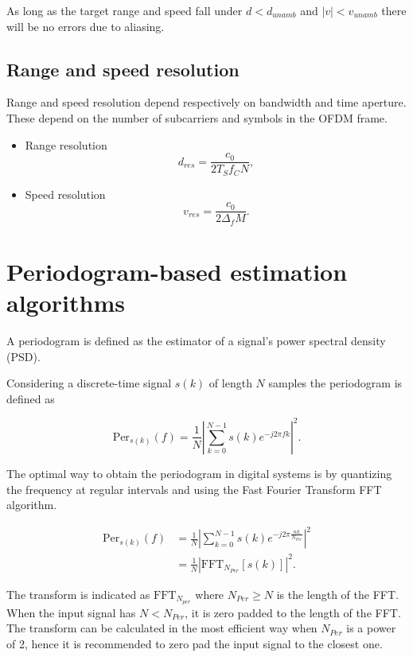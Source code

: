         As long as the target range and speed fall under $d < d_{unamb}$ and $|v| < v_{unamb}$ there will be no errors due to aliasing.
        
    \subsection{Range and speed resolution}
    
        Range and speed resolution depend respectively on bandwidth and time aperture. These depend on the number of subcarriers and symbols in the OFDM frame.
        
        \begin{itemize}
            \item Range resolution
            $$ d_{res} = \frac{c_0}{2 T_S f_C N}, $$
            \item Speed resolution
            $$ v_{res} = \frac{c_0}{2\Delta_f M}. $$
        \end{itemize}
        

        
\section{Periodogram-based estimation algorithms}
    
    A periodogram is defined as the estimator of a signal's power spectral density (PSD).
    
    Considering a discrete-time signal $s(k)$ of length $N$ samples the periodogram is defined as
    
    \begin{equation}
        \text{Per}_{s(k)}(f) = \frac{1}{N}\left| \sum_{k=0}^{N-1} s(k)e^{-j2\pi fk}\right|^2.
    \end{equation}

    The optimal way to obtain the periodogram in digital systems is by quantizing the frequency at regular intervals and using the Fast Fourier Transform FFT algorithm.

    \begin{align}
        \text{Per}_{s(k)}(f) &= \frac{1}{N}\left| \sum_{k=0}^{N-1} s(k)e^{-j2\pi \frac{nk}{N_{Per}}}\right|^2 \\
        &= \frac{1}{N}\left| \text{FFT}_{N_{Per}}[s(k)]\right|^2.
    \end{align}
    
    
    The transform is indicated as $\text{FFT}_{N_{per}}$ where $N_{Per} \geq N$ is the length of the FFT. When the input signal has $N < N_{Per}$, it is zero padded to the length of the FFT.
    The transform can be calculated in the most efficient way when $N_{Per}$ is a power of 2, hence it is recommended to zero pad the input signal to the closest one.

